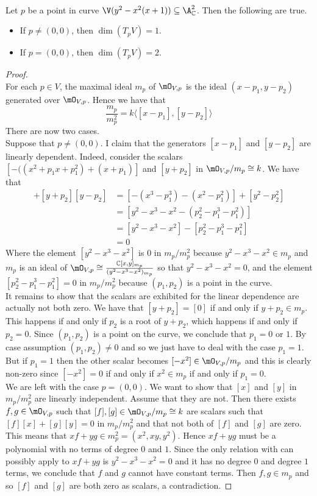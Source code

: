 \documentclass[a4paper]{article}
\begin{document}
\begin{eg}{}{}\\
Let $p$ be a point in curve $\V(y^2-x^2(x+1))\subseteq\A_\C^2$. Then the following are true. 
\begin{itemize}
\item If $p\neq(0,0)$, then $\dim(T_pV)=1$. 
\item If $p=(0,0)$, then $\dim(T_pV)=2$. 
\end{itemize}
\begin{proof}\\
For each $p\in V$, the maximal ideal $m_p$ of $\mO_{V,p}$ is the ideal $(x-p_1,y-p_2)$ generated over $\mO_{V,p}$. Hence we have that $$\frac{m_p}{m_p^2}=k\langle [x-p_1],[y-p_2]\rangle$$ There are now two cases. \\

Suppose that $p\neq(0,0)$. I claim that the generators $[x-p_1]$ and $[y-p_2]$ are linearly dependent. Indeed, consider the scalars $[-((x^2+p_1x+p_1^2)+(x+p_1)]$ and $[y+p_2]$ in $\mO_{V,p}/m_p\cong k$. We have that 
\begin{align*}
[-((x^2+p_1x+p_1^2)+(x+p_1)][x-p_1]+[y+p_2][y-p_2]&=[-(x^3-p_1^3)-(x^2-p_1^2)]+[y^2-p_2^2]\\
&=[y^2-x^3-x^2-(p_2^2-p_1^3-p_1^2)]\\
&=[y^2-x^3-x^2]-[p_2^2-p_1^3-p_1^2]\\
&=0
\end{align*}
Where the element $[y^2-x^3-x^2]$ is $0$ in $m_p/m_p^2$ because $y^2-x^3-x^2\in m_p$ and $m_p$ is an ideal of $\mO_{V,p}\cong\frac{\C[x,y]_{m_p}}{(y^2-x^3-x^2)_{m_p}}$ so that $y^2-x^3-x^2=0$, and the element $[p_2^2-p_1^3-p_1^2]=0$ in $m_p/m_p^2$ because $(p_1,p_2)$ is a point in the curve. \\

It remains to show that the scalars are exhibited for the linear dependence are actually not both zero. We have that $[y+p_2]=[0]$ if and only if $y+p_2\in m_p$. This happens if and only if $p_2$ is a root of $y+p_2$, which happens if and only if $p_2=0$. Since $(p_1,p_2)$ is a point on the curve, we conclude that $p_1=0$ or $1$. By case assumption $(p_1,p_2)\neq 0$ and so we just have to deal with the case $p_1=1$. But if $p_1=1$ then the other scalar becomes $[-x^2]\in \mO_{V,p}/m_p$ and this is clearly non-zero since $[-x^2]=0$ if and only if $x^2\in m_p$ if and only if $p_1=0$. \\

We are left with the case $p=(0,0)$. We want to show that $[x]$ and $[y]$ in $m_p/m_p^2$ are linearly independent. Assume that they are not. Then there exists $f,g\in\mO_{V,p}$ such that $[f],[g]\in\mO_{V,p}/m_p\cong k$ are scalars such that $[f][x]+[g][y]=0$ in $m_p/m_p^2$ and that not both of $[f]$ and $[g]$ are zero. This means that $xf+yg\in m_p^2=(x^2,xy,y^2)$. Hence $xf+yg$ must be a polynomial with no terms of degree $0$ and $1$. Since the only relation with can possibly apply to $xf+yg$ is $y^2-x^3-x^2=0$ and it has no degree $0$ and degree $1$ terms, we conclude that $f$ and $g$ cannot have constant terms. Then $f,g\in m_p$ and so $[f]$ and $[g]$ are both zero as scalars, a contradiction. 
\end{proof}
\end{eg}
\end{document}
